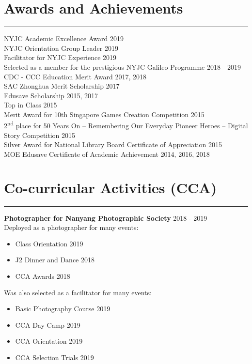 \documentclass[letterpaper,11pt]{article}
\begin{document}
    \section{Awards and Achievements}
    \vspace{-0.5em}
    \hrule
    \vspace{0.5em}
    NYJC Academic Excellence Award \hfill 2019
    \\
    NYJC Orientation Group Leader \hfill 2019
    \\
    Facilitator for NYJC Experience \hfill 2019
    \\
    Selected as a member for the prestigious NYJC Galileo Programme \hfill 2018 - 2019
    \\
    CDC - CCC Education Merit Award \hfill 2017, 2018
    \\
    SAC Zhonghua Merit Scholarship \hfill 2017
    \\
    Edusave Scholarship \hfill 2015, 2017
    \\
    Top in Class \hfill 2015
    \\
    Merit Award for 10th Singapore Games Creation Competition \hfill 2015
    \\
    2\textsuperscript{nd} place for 50 Years On – Remembering Our Everyday Pioneer Heroes – Digital 
    Story Competition \hfill 2015
    \\
    Silver Award for National Library Board Certificate of Appreciation \hfill 2015
    \\
    MOE Edusave Certificate of Academic Achievement \hfill 2014, 2016, 2018

    \section{Co-curricular Activities (CCA)}
    \vspace{-0.5em}
    \hrule
    \vspace{0.5em}
    \textbf{Photographer for Nanyang Photographic Society} \hfill 2018 - 2019
    \\
    Deployed as a photographer for many events:
    \\
    \vspace{-0.75em}
    \begin{itemize}[itemsep=-0.5em, label=\textbullet]
        \item Class Orientation  \hfill 2019
        \item J2 Dinner and Dance \hfill 2018
        \item CCA Awards \hfill 2018
    \end{itemize}
    \vspace{-0.5em}
    Was also selected as a facilitator for many events: 
    \vspace{-0.75em}
    \begin{itemize}[itemsep=-0.5em, label=\textbullet]
        \item Basic Photography Course  \hfill 2019
        \item CCA Day Camp \hfill 2019
        \item CCA Orientation \hfill 2019
        \item CCA Selection Trials \hfill 2019
    \end{itemize}
\end{document}
